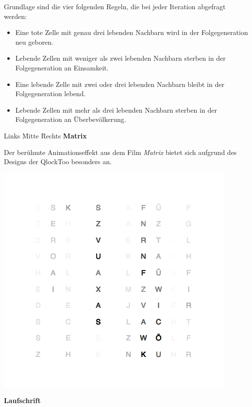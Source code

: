 \begin{multicols}{2}
Grundlage sind die vier folgenden Regeln, die bei jeder Iteration abgefragt werden:
\begin{itemize}
\item Eine tote Zelle mit genau drei lebenden Nachbarn wird in der Folgegeneration neu geboren.
\item Lebende Zellen mit weniger als zwei lebenden Nachbarn sterben in der Folgegeneration an Einsamkeit.
\item Eine lebende Zelle mit zwei oder drei lebenden Nachbarn bleibt in der Folgegeneration lebend.
\item Lebende Zellen mit mehr als drei lebenden Nachbarn sterben in der Folgegeneration an Überbevölkerung.
\end{itemize}

\begin{tabbing}  
 Links \= Mitte \= Rechts \kill
 \> \textbf{Matrix}
\end{tabbing}

Der berühmte Animationseffekt aus dem Film \emph{Matrix} bietet sich aufgrund des Designs der QlockToo besonders an.

{
    \centering
    \includegraphics[width=\columnwidth]{Abbildungen/Software/Demo/Matrix}
    
}

\textbf{Laufschrift}


\end{multicols}
